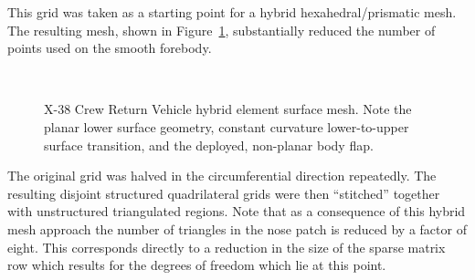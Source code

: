 This grid was taken as a starting point for a hybrid hexahedral/prismatic mesh.  The resulting mesh, shown in Figure~\ref{fig:x38_mesh}, substantially reduced the number of points used on the smooth forebody.
\begin{figure}
  \begin{center}
     \\
    \caption[X-38 Crew Return Vehicle hybrid element surface mesh.]{X-38 Crew Return Vehicle hybrid element surface mesh. Note the planar lower surface geometry, constant curvature lower-to-upper surface transition, and the deployed, non-planar body flap.\label{fig:x38_mesh}}
  \end{center}
\end{figure}
The original grid was halved in the circumferential direction repeatedly.  The resulting disjoint structured quadrilateral grids were then ``stitched'' together with unstructured triangulated regions.  Note that as a consequence of this hybrid mesh approach the number of triangles in the nose patch is reduced by a factor of eight.  This corresponds directly to a reduction in the size of the sparse matrix row which results for the degrees of freedom which lie at this point.

